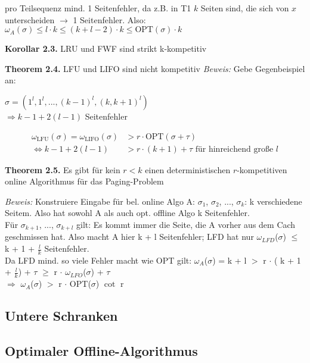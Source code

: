 \documentclass[a4paper]{report}
\begin{document}
pro Teilsequenz mind. 1 Seitenfehler, da z.B. in T1 $k$ Seiten sind, die sich von $x$ unterscheiden $\to$ 1 Seitenfehler.
Also: $\omega_{A}(\sigma) \le l \cdot k \le (k + l - 2) \cdot k \le \textrm{OPT}(\sigma) \cdot k$



\textbf{Korollar 2.3.} LRU und FWF sind strikt k-kompetitiv



\textbf{Theorem 2.4.} LFU und LIFO sind nicht kompetitiv
\textit{Beweis:} Gebe Gegenbeispiel an:

$\sigma = \left(1^l, 1^l, ..., (k-1)^l, (k, k+1)^l\right)$\\
$\Rightarrow k - 1 + 2(l - 1)$ Seitenfehler

\begin{align*}
\omega_{\textrm{LFU}}(\sigma) = \omega_{\textrm{LIFO}}(\sigma) &> r \cdot \textrm{OPT}(\sigma + \tau)\\
\Leftrightarrow k - 1 + 2 (l - 1) &> r \cdot (k + 1) + \tau \textrm{ für hinreichend große } l
\end{align*}



\textbf{Theorem 2.5.} Es gibt für kein $r < k$ einen deterministischen $r$-kompetitiven online Algorithmus für das Paging-Problem

\textit{Beweis:} Konstruiere Eingabe für bel. online Algo A: $\sigma_{1}$, $\sigma_{2}$, ..., $\sigma_{k}$: k verschiedene Seitem. Also hat sowohl A als auch opt. offline Algo k Seitenfehler.\\
Für $\sigma_{k + 1}$, ..., $\sigma_{k + l}$ gilt: Es kommt immer die Seite, die A vorher aus dem Cach geschmissen hat. Also macht A hier k + l Seitenfehler; LFD hat nur $\omega_{LFD}$($\sigma$) $\le$ k + 1 + $\tfrac{l}{k}$ Seitenfehler. \\
Da LFD mind. so viele Fehler macht wie OPT gilt: $\omega_{A}$($\sigma$) = k + l $>$ r $\cdot$ ( k + 1 + $\tfrac{l}{k}$) + $\tau$ $\ge$ r $\cdot$ $\omega_{LFO}$($\sigma$) + $\tau$ \\
 $\Rightarrow$  $\omega_{A}$($\sigma$) $>$ r $\cdot$ OPT($\sigma$) $\cot$ r


\subsection{Untere Schranken}


\subsection{Optimaler Offline-Algorithmus}
\end{document}
